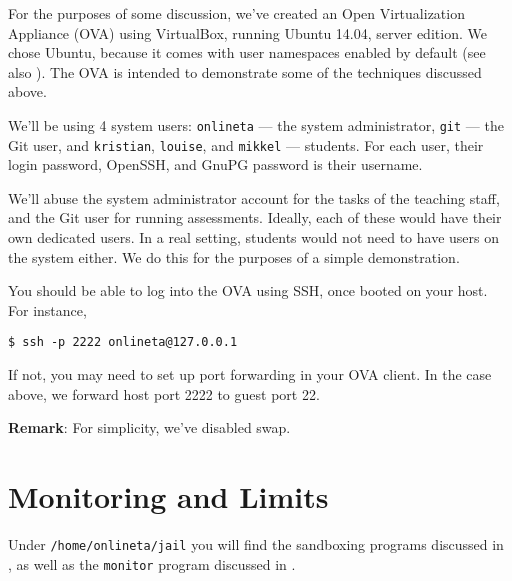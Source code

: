 For the purposes of some discussion, we've created an Open Virtualization
Appliance (OVA) using VirtualBox, running Ubuntu 14.04, server edition. We
chose Ubuntu, because it comes with user namespaces enabled by default (see
also ). The OVA is intended to
demonstrate some of the techniques discussed above.






We'll be using 4 system users: \texttt{onlineta} --- the system administrator,
\texttt{git} --- the Git user, and \texttt{kristian}, \texttt{louise}, and
\texttt{mikkel} --- students. For each user, their login password, OpenSSH, and
GnuPG password is their username.

We'll abuse the system administrator account for the tasks of the teaching
staff, and the Git user for running assessments. Ideally, each of these would
have their own dedicated users. In a real setting, students would not need to
have users on the system either. We do this for the purposes of a simple
demonstration.

You should be able to log into the OVA using SSH, once booted on your host.
For instance,

\begin{lstlisting}
$ ssh -p 2222 onlineta@127.0.0.1
\end{lstlisting}

If not, you may need to set up port forwarding in your OVA client. In the case
above, we forward host port 2222 to guest port 22.

\textbf{Remark}: For simplicity, we've disabled swap.

\section{Monitoring and Limits}

Under \texttt{/home/onlineta/jail} you will find the sandboxing programs
discussed in , as well
as the \texttt{monitor} program discussed in
.

